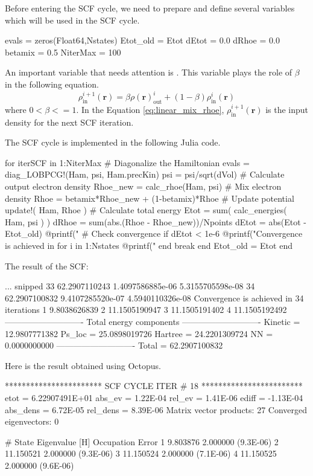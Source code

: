 Before entering the SCF cycle, we need to prepare and define several variables
which will be used in the SCF cycle.
\begin{juliacode}
evals = zeros(Float64,Nstates)
Etot_old = Etot
dEtot = 0.0
dRhoe = 0.0
betamix = 0.5
NiterMax = 100
\end{juliacode}
An important variable that needs attention is . This variable
plays the role of $\beta$ in the following equation.
\begin{equation}
\rho^{i+1}_{\mathrm{in}}(\mathbf{r}) = \beta\rho(\mathbf{r})^{i}_{\mathrm{out}} +
(1 - \beta)\rho^{i}_{\mathrm{in}}(\mathbf{r})
\label{eq:linear_mix_rhoe}
\end{equation}
where $0 < \beta <= 1$.
In the Equation \eqref{eq:linear_mix_rhoe}, $\rho^{i+1}_{\mathrm{in}}(\mathbf{r})$
is the input density for the next SCF iteration.

The SCF cycle is implemented in the following Julia code.
\begin{juliacode}
for iterSCF in 1:NiterMax
  # Diagonalize the Hamiltonian
  evals = diag_LOBPCG!(Ham, psi, Ham.precKin)
  psi = psi/sqrt(dVol)
  # Calculate output electron density
  Rhoe_new = calc_rhoe(Ham, psi)
  # Mix electron density
  Rhoe = betamix*Rhoe_new + (1-betamix)*Rhoe
  # Update potential
  update!( Ham, Rhoe )
  # Calculate total energy
  Etot = sum( calc_energies( Ham, psi ) )
  dRhoe = sum(abs.(Rhoe - Rhoe_new))/Npoints
  dEtot = abs(Etot - Etot_old)
  @printf("%
  # Check convergence
  if dEtot < 1e-6
    @printf("Convergence is achieved in %
    for i in 1:Nstates
      @printf("%
    end
    break
  end
  Etot_old = Etot
end
\end{juliacode}

The result of the SCF:
\begin{textcode}
... snipped
  33      62.2907110243   1.4097586885e-06   5.3155705598e-08
  34      62.2907100832   9.4107285520e-07   4.5940110326e-08
Convergence is achieved in 34 iterations
 1       9.8038626839
 2      11.1505190947
 3      11.1505191402
 4      11.1505192492
----------------------------
Total energy components
----------------------------
Kinetic =      12.9807771382
Ps_loc  =      25.0898019726
Hartree =      24.2201309724
NN      =       0.0000000000
----------------------------
Total   =      62.2907100832
\end{textcode}

Here is the result obtained using Octopus.
\begin{textcode}
 *********************** SCF CYCLE ITER #   18 ************************
 etot  =  6.22907491E+01 abs_ev   =  1.22E-04 rel_ev   =  1.41E-06
 ediff =       -1.13E-04 abs_dens =  6.72E-05 rel_dens =  8.39E-06
Matrix vector products:     27
Converged eigenvectors:      0

#  State  Eigenvalue [H]  Occupation    Error
      1        9.803876    2.000000   (9.3E-06)
      2       11.150521    2.000000   (9.3E-06)
      3       11.150524    2.000000   (7.1E-06)
      4       11.150525    2.000000   (9.6E-06) 
\end{textcode}

